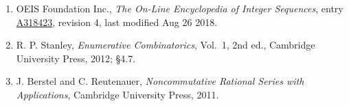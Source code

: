\documentclass[11pt]{article}
\theoremstyle{definition}
\begin{document}
\begin{enumerate}

\item OEIS Foundation Inc., \emph{The On-Line Encyclopedia of Integer Sequences}, entry \href{https://oeis.org/A318423}{A318423}, revision 4, last modified Aug 26 2018.

\item R. P. Stanley, \emph{Enumerative Combinatorics}, Vol.~1, 2nd ed., Cambridge University Press, 2012; \S4.7.

\item J. Berstel and C. Reutenauer, \emph{Noncommutative Rational Series with Applications}, Cambridge University Press, 2011.

\end{enumerate}
\end{document}
